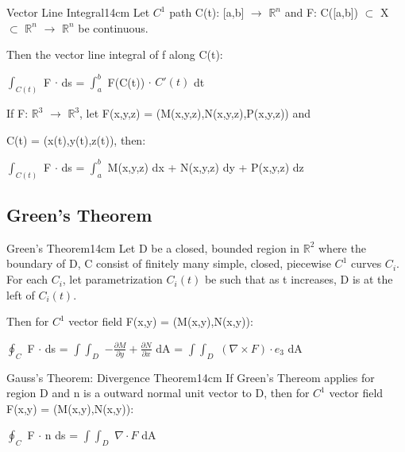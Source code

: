     \begin{wtheorem}{Vector Line Integral}{14cm}
        Let $C^1$ path C(t): [a,b] $\rightarrow$ $\mathbb{R}^n$
        and F: C([a,b]) $\subset$ X $\subset$ $\mathbb{R}^n$ $\rightarrow$
        $\mathbb{R}^n$ be continuous.

        Then the {\color{lblue} vector line integral}
        of f along C(t):

        \hspace{0.5cm}
        $\int_{C(t)}$ F $\cdot$ ds = $\int_a^b$ F(C(t)) $\cdot$ $C'(t)$ dt

        If F: $\mathbb{R}^3$ $\rightarrow$ $\mathbb{R}^3$, let
        F(x,y,z) = (M(x,y,z),N(x,y,z),P(x,y,z)) and

        C(t) = (x(t),y(t),z(t)), then:

        \hspace{0.5cm}
        $\int_{C(t)}$ F $\cdot$ ds
        = $\int_a^b$ M(x,y,z) dx + N(x,y,z) dy + P(x,y,z) dz
    \end{wtheorem}

    \vspace{0.5cm}





\subsection{ Green's Theorem }

    \begin{wtheorem}{Green's Theorem}{14cm}
        Let D be a closed, bounded region in $\mathbb{R}^2$
        where the boundary of D, C consist of finitely many simple, closed,
        piecewise $C^1$ curves $C_i$.
        For each $C_i$, let parametrization $C_i(t)$ be such that
        as t increases, D is at the left of $C_i(t)$.

        Then for $C^1$ vector field F(x,y) = (M(x,y),N(x,y)):

        \hspace{0.5cm}
        $\oint_C$ F $\cdot$ ds
        = $\int \int_D$ $-\frac{\partial M}{\partial y}
                        + \frac{\partial N}{\partial x}$ dA
        = $\int \int_D$ $(\nabla \times F) \cdot e_3$ dA
    \end{wtheorem}

    \vspace{0.5cm}



    \begin{wtheorem}{Gauss's Theorem: Divergence Theorem}{14cm}
        If Green's Thereom applies for region D and n is a outward normal
        unit vector to D, then for $C^1$ vector field F(x,y) = (M(x,y),N(x,y)):

        \hspace{0.5cm}
        $\oint_C$ F $\cdot$ n ds
        = $\int \int_D$ $\nabla \cdot F$ dA
        
    \end{wtheorem}


